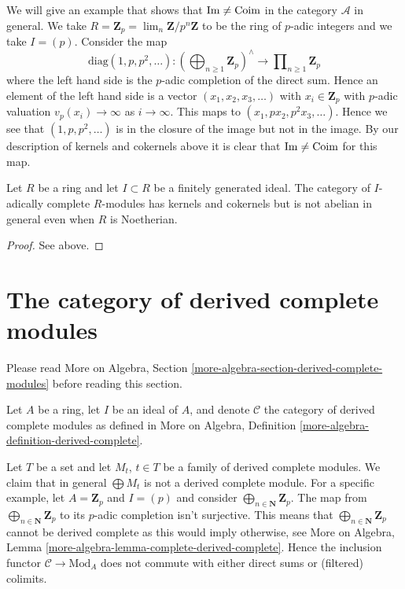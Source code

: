 \noindent
We will give an example that shows that $\mathop{\mathrm{Im}} \not = \mathop{\mathrm{Coim}}$ in the
category $\mathcal{A}$ in general. We take
$R = \mathbf{Z}_p = \lim_n \mathbf{Z}/p^n\mathbf{Z}$
to be the ring of $p$-adic integers and we take $I = (p)$.
Consider the map
$$
\text{diag}(1, p, p^2, \ldots) :
\left(\bigoplus\nolimits_{n \geq 1} \mathbf{Z}_p\right)^\wedge
\longrightarrow
\prod\nolimits_{n \geq 1} \mathbf{Z}_p
$$
where the left hand side is the $p$-adic completion of the direct sum.
Hence an element of the left hand side is a vector $(x_1, x_2, x_3, \ldots)$
with $x_i \in \mathbf{Z}_p$ with $p$-adic valuation $v_p(x_i) \to \infty$ as
$i \to \infty$. This maps to $(x_1, px_2, p^2x_3, \ldots)$. Hence we see
that $(1, p, p^2, \ldots)$ is in the closure of the image but not in
the image. By our description of kernels and cokernels above it is
clear that $\mathop{\mathrm{Im}} \not = \mathop{\mathrm{Coim}}$ for this map.

\begin{lemma}
\label{lemma-complete-modules-not-abelian}
Let $R$ be a ring and let $I \subset R$ be a finitely generated ideal.
The category of $I$-adically complete $R$-modules has kernels and
cokernels but is not abelian in general even when $R$ is Noetherian.
\end{lemma}

\begin{proof}
See above.
\end{proof}





\section{The category of derived complete modules}
\label{section-derived-complete-modules}

\noindent
Please read More on Algebra, Section
\ref{more-algebra-section-derived-complete-modules}
before reading this section.

\medskip\noindent
Let $A$ be a ring, let $I$ be an ideal of $A$, and denote $\mathcal{C}$
the category of derived complete modules as defined in
More on Algebra, Definition \ref{more-algebra-definition-derived-complete}.

\medskip\noindent
Let $T$ be a set and let $M_t$, $t \in T$ be a family of derived complete
modules. We claim that in general $\bigoplus M_t$ is not a derived complete
module. For a specific example, let $A = \mathbf{Z}_p$ and $I = (p)$ and
consider $\bigoplus_{n \in \mathbf{N}} \mathbf{Z}_p$. The map from
$\bigoplus_{n \in \mathbf{N}} \mathbf{Z}_p$ to its $p$-adic completion
isn't surjective. This means that $\bigoplus_{n \in \mathbf{N}} \mathbf{Z}_p$
cannot be derived complete as this would imply otherwise, see
More on Algebra, Lemma \ref{more-algebra-lemma-complete-derived-complete}.
Hence the inclusion functor $\mathcal{C} \to \text{Mod}_A$ does not commute
with either direct sums or (filtered) colimits.

